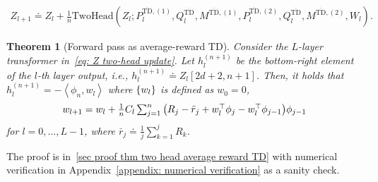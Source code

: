 \documentclass{article}
\newcommand{\R}{\mathbb{R}}
\newcommand{\indot}[2]{{\left<#1, #2\right>}}
\newcommand{\attn}{\text{LinAttn}}
\newcommand{\twohead}{\text{TwoHead}}
\newcommand{\td}{\text{TD}}
\newcommand{\bartd}{\overline{\text{TD}}}
\newtheorem{theorem}{Theorem}
\begin{document}
\begin{align}
    \label{eq: Z two-head update}
    \textstyle Z_{l+1} \doteq Z_l + \frac{1}{n} \twohead(Z_l; P_l^{\bartd, (1)}, Q_l^{\bartd}, M^{\bartd, (1)}, P_l^{\bartd, (2)}, Q_l^{\bartd}, M^{\bartd, (2)}, W_l).
\end{align}
\begin{theorem}[Forward pass as average-reward TD]
    \label{thm two head average reward TD}
  Consider the $L$-layer transformer in~\eqref{eq: Z two-head update}.
  Let $h_l^{(n+1)}$ be the bottom-right element of the $l$-th layer output, i.e.,  $h_l^{(n+1)} \doteq Z_l[2d+2, n+1]$.
  Then, it holds that $h_l^{(n+1)} =  -\indot{\phi_n}{w_l}$ where $\qty{w_l}$ is defined as $w_0 = 0$,
  \begin{align}
   \textstyle{w_{l+1} = w_l + \frac{1}{n} C_l \sum_{j=1}^n  \qty(R_j - \bar{r}_j + w_l^\top \phi_j - w_l^\top \phi_{j-1})\phi_{j-1}}
  \end{align}
  for $l = 0, \dots, L-1$, where $\bar{r}_j \doteq \frac{1}{j}\sum_{k=1}^j R_k$.
\end{theorem}
The proof is in~\ref{sec proof thm two head average reward TD} with numerical verification in Appendix~\ref{appendix: numerical verification} as a sanity check.
\end{document}
